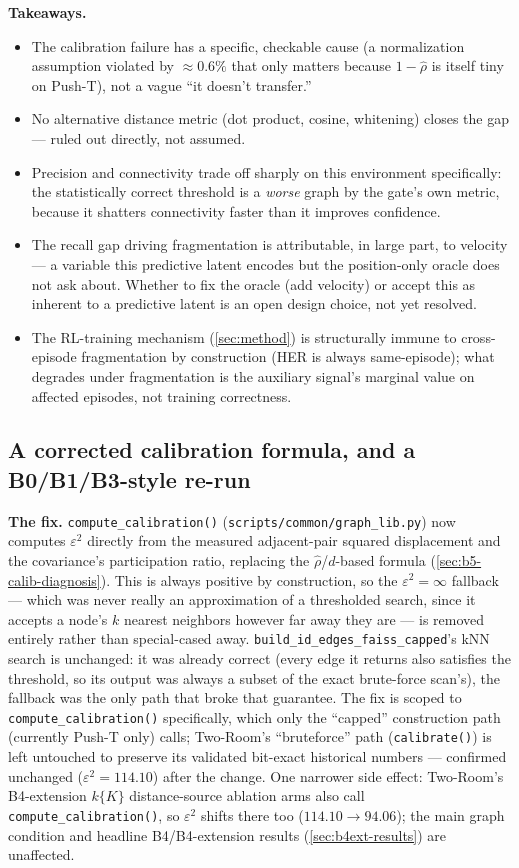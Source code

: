 \documentclass[11pt]{article}
\begin{document}
\textbf{Takeaways.}
\begin{itemize}[leftmargin=1.4em,itemsep=2pt]
\item The calibration failure has a specific, checkable cause (a normalization assumption
violated by $\approx0.6\%$ that only matters because $1-\hat\rho$ is itself tiny on Push-T), not
a vague ``it doesn't transfer.''
\item No alternative distance metric (dot product, cosine, whitening) closes the gap --- ruled
out directly, not assumed.
\item Precision and connectivity trade off sharply on this environment specifically: the
statistically correct threshold is a \emph{worse} graph by the gate's own metric, because it
shatters connectivity faster than it improves confidence.
\item The recall gap driving fragmentation is attributable, in large part, to velocity --- a
variable this predictive latent encodes but the position-only oracle does not ask about. Whether
to fix the oracle (add velocity) or accept this as inherent to a predictive latent is an open
design choice, not yet resolved.
\item The RL-training mechanism (\cref{sec:method}) is structurally immune to cross-episode
fragmentation by construction (HER is always same-episode); what degrades under fragmentation is
the auxiliary signal's marginal value on affected episodes, not training correctness.
\end{itemize}

\subsection{A corrected calibration formula, and a B0/B1/B3-style re-run}
\label{sec:b5-calib-fix}

\textbf{The fix.} \texttt{compute\_calibration()} (\texttt{scripts/common/graph\_lib.py}) now
computes $\varepsilon^2$ directly from the measured adjacent-pair squared displacement and the
covariance's participation ratio, replacing the $\hat\rho$/$d$-based formula
(\cref{sec:b5-calib-diagnosis}). This is always positive by construction, so the
$\varepsilon^2{=}\infty$ fallback --- which was never really an approximation of a thresholded
search, since it accepts a node's $k$ nearest neighbors however far away they are --- is removed
entirely rather than special-cased away. \texttt{build\_id\_edges\_faiss\_capped}'s kNN search is
unchanged: it was already correct (every edge it returns also satisfies the threshold, so its
output was always a subset of the exact brute-force scan's), the fallback was the only path that
broke that guarantee. The fix is scoped to \texttt{compute\_calibration()} specifically, which
only the ``capped'' construction path (currently Push-T only) calls; Two-Room's ``bruteforce''
path (\texttt{calibrate()}) is left untouched to preserve its validated bit-exact historical
numbers --- confirmed unchanged ($\varepsilon^2{=}114.10$) after the change. One narrower side
effect: Two-Room's B4-extension $k\{K\}$ distance-source ablation arms also call
\texttt{compute\_calibration()}, so $\varepsilon^2$ shifts there too ($114.10 \to 94.06$); the
main graph condition and headline B4/B4-extension results (\cref{sec:b4ext-results}) are
unaffected.
\end{document}
